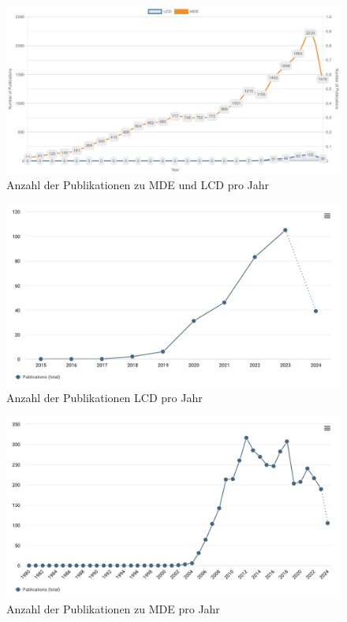 \begin{figure}[h!]
    \centering
    \includegraphics[width=1\textwidth]{graphics/lcd_and_mde_publications_over_years.png}
    \caption{Anzahl der Publikationen zu MDE und LCD pro Jahr}
    \label{fig:publications_mde_and_lcd_per_year}
\end{figure}

\begin{figure}[h!]
    \centering
    \includegraphics[width=1\textwidth]{graphics/lcd_publications_over_years.png}
    \caption{Anzahl der Publikationen LCD pro Jahr}
    \label{fig:publications_lcd_per_year}
\end{figure}

\begin{figure}[h!]
    \centering
    \includegraphics[width=1\textwidth]{graphics/mde_publications_over_years.png}
    \caption{Anzahl der Publikationen zu MDE pro Jahr}
    \label{fig:publications_mde_per_year}
\end{figure}


